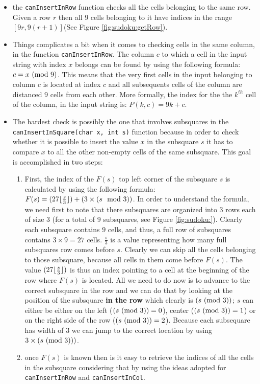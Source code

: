 \begin{itemize}
	\item the \lstinline[columns=fixed]{canInsertInRow} function checks all the cells
	belonging to the same row. Given a row $r$ then all $9$ cells belonging to it have indices in the range $[9r,9(r+1)]$(See Figure \ref{fig:sudoku:getRow}).
	\item Things complicates a bit when it comes to checking cells in the same column, in the function \lstinline[columns=fixed]{canInsertInRow}.
	The column $c$ to which a cell in the input string with index $x$ belongs can be found by using the following formula: $c = x \ (\mathrm{mod}\ 9)$. This means that
	the very first cells in the input belonging to column $c$ is located at index $c$ and all subsequents cells of the column are distanced $9$ cells
	from each other. More formally, the index for the the $k^{th}$ cell of the column, in the input string is: $P(k,c) = 9k+c$.
	\item The hardest check is possibly the one that involves subsquares in the
	\lstinline[columns=fixed]{canInsertInSquare(char x, int s)} function because in order to check
	whether it is possible to insert the value $x$ in the subsquare $s$ it has to compare $x$ to all
	the other non-empty cells of the same subsquare. This goal is accomplished in two steps:
	\begin{enumerate}
		\item First, the index of the $F(s)$ top left corner of the subsquare $s$ is calculated  by
		using the following formula: $F(s) = (27 \lfloor\frac{s}{3}\rfloor) + (3\times (s \mod{3}))$.  In
		order to understand the formula, we need first to note that there subsquares are organized
		into $3$ rows each of size $3$ (for a total of 9 subsquares, see Figure \ref{fig:sudoku:}).
		Clearly each subsquare contains $9$ cells, and thus, a full row of subsquares contains
		$3\times9 =27$ cells. $\frac{s}{3}$ is a value representing how many full subsquares row
		comes before $s$. Clearly we can skip all the cells belonging to those subsquare, because
		all cells in them come before $F(s)$. The value $(27 \lfloor\frac{s}{3}\rfloor)$ is thus an index
		pointing to a cell at the beginning of the row where $F(s)$ is located. All we need to do
		now is to advance to the correct subsquare in the row and we can do that by looking at the
		position of the subsquare \textbf{in the row} which clearly is $(s \ (\mathrm{mod}\ 3))$; $s$ can either 
		be either on the left ($(s \ (\mathrm{mod}\ 3))=0$), center ($(s \ (\mathrm{mod}\ 3))=1$) or on the right side of the row ($(s \ (\mathrm{mod}\ 3))=2$).
		Because each subsequare has width of $3$ we can jump to the correct location by using $3\times  (s \ (\mathrm{mod}\ 3)))$. 
		\item once $F(s)$ is known then is it easy to retrieve the indices of all the cells in the
		subsquare considering that by using the ideas adopted for \lstinline[columns=fixed]{canInsertInRow} and
		\lstinline[columns=fixed]{canInsertInCol}.
	\end{enumerate}
	
\end{itemize}











